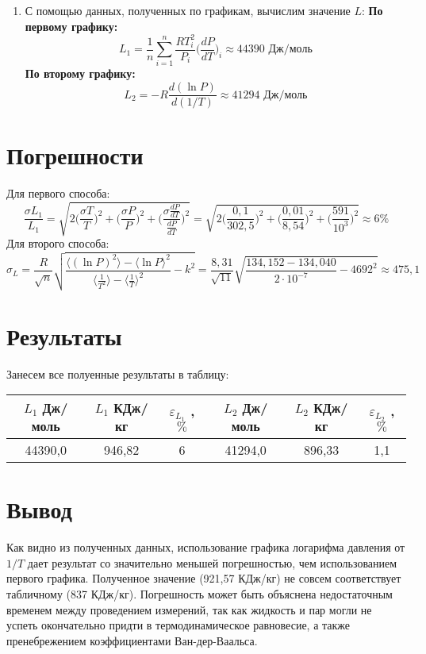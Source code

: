 \documentclass[12pt]{article}
\begin{document}
\begin{enumerate}
    	\item С помощью данных, полученных по графикам, вычислим значение $L$: \newline
    	\textbf{По первому графику:}
    	\begin{equation*}
    		L_1 = \frac{1}{n} \sum_{i=1}^n \frac{RT_i^2}{P_i}\bigg(\frac{dP}{dT}\bigg)_i \approx 44390 \text{ Дж/моль}
    	\end{equation*}
    	\textbf{По второму графику:}
    		\begin{equation*}
    		L_2 = -R\frac{d(\ln P)}{d(1/T)} \approx 41294 \text{ Дж/моль}
    	\end{equation*}
\end{enumerate}
\section{Погрешности}
Для первого способа:
\begin{equation*}
\frac{\sigma L_1}{L_1} = \sqrt{2\Big(\frac{\sigma T}{T}\Big)^2 + \Big(\frac{\sigma P}{P}\Big)^2 + \Big(\frac{\sigma \frac{dP}{dT}}{\frac{dP}{dT}}\Big)^2} = \sqrt{2\Big(\frac{0,1}{302,5}\Big)^2 + \Big(\frac{0,01}{8,54}\Big)^2 + \Big(\frac{591}{10^3}\Big)^2} \approx 6\%
\end{equation*}
Для второго способа:
\begin{equation*}
\sigma_L = \frac{R}{\sqrt{n}}\sqrt{\frac{\langle (\ln P)^2 \rangle - \langle \ln P \rangle^2}{\langle \frac{1}{T^2} \rangle - \langle \frac{1}{T} \rangle^2}-k^2} =\frac{8,31}{\sqrt{11}}\sqrt{\frac{134,152 - 134,040}{2\cdot 10^{-7}} - 4692^2} \approx 475,1
\end{equation*}
\section{Результаты}
Занесем все полуенные результаты в таблицу:\newline

\begin{minipage}{\linewidth}
\centering
{} \label{tab:title} 
\begin{tabular}{|c|c|c|c|c|c|}
\hline 
$L_1$ Дж/моль & $L_1$ КДж/кг & $\varepsilon_{L_1}$ , $\%$  & $L_2$ Дж/моль & $L_2$ КДж/кг & $\varepsilon_{L_2}$ , $\%$  \\ 
\hline 
44390,0 & 946,82 & 6 & 41294,0 & 896,33 & 1,1 \\ 
\hline 
\end{tabular} 
\end{minipage}

\section{Вывод}
Как видно из полученных данных, использование графика логарифма давления от $1/T$ дает результат со значительно меньшей погрешностью, чем использованием первого графика. Полученное значение (921,57 КДж/кг) не совсем соответствует табличному (837 КДж/кг). Погрешность может быть объяснена недостаточным временем между проведением измерений, так как жидкость и пар могли не успеть окончательно придти в термодинамическое равновесие, а также пренебрежением коэффициентами Ван-дер-Ваальса.
\end{document}
